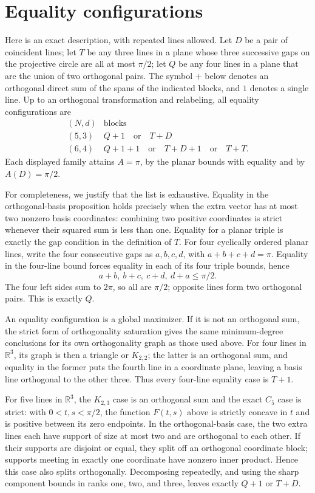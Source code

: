 \documentclass[11pt]{article}
\begin{document}
\section*{Equality configurations}

Here is an exact description, with repeated lines allowed.  Let $D$
be a pair of coincident lines; let $T$ be any three lines in a plane
whose three successive gaps on the projective circle are all at most
$\pi/2$; let $Q$ be any four lines in a plane that are the union of
two orthogonal pairs.  The symbol $+$ below denotes an orthogonal
direct sum of the spans of the indicated blocks, and $1$ denotes a
single line.  Up to an orthogonal transformation and relabeling,
all equality configurations are
\[
 \begin{array}{c|c}
 (N,d)&\text{blocks}\\ \hline
 (5,3)&Q+1\quad\text{or}\quad T+D\\
 (6,4)&Q+1+1\quad\text{or}\quad T+D+1
                  \quad\text{or}\quad T+T.
 \end{array}
\]
Each displayed family attains $A=\pi$, by the planar bounds with
equality and by $A(D)=\pi/2$.

For completeness, we justify that the list is exhaustive.  Equality
in the orthogonal-basis proposition holds precisely when the extra
vector has at most two nonzero basis coordinates: combining two
positive coordinates is strict whenever their squared sum is less
than one.  Equality for a planar triple is exactly the gap condition
in the definition of $T$.  For four cyclically ordered planar lines,
write the four consecutive gaps as $a,b,c,d$, with
$a+b+c+d=\pi$.  Equality in the four-line bound forces equality in
each of its four triple bounds, hence
\[
 a+b,\ b+c,\ c+d,\ d+a\leq\pi/2.
\]
The four left sides sum to $2\pi$, so all are $\pi/2$; opposite
lines form two orthogonal pairs.  This is exactly $Q$.

An equality configuration is a global maximizer.  If it is not an
orthogonal sum, the strict form of orthogonality saturation gives
the same minimum-degree conclusions for its own orthogonality graph
as those used above.  For four lines in $\mathbb R^3$, its graph is
then a triangle or $K_{2,2}$; the latter is an orthogonal sum, and
equality in the former puts the fourth line in a coordinate plane,
leaving a basis line orthogonal to the other three.  Thus every
four-line equality case is $T+1$.

For five lines in $\mathbb R^3$, the $K_{2,3}$ case is an orthogonal
sum and the exact $C_5$ case is strict: with $0<t,s<\pi/2$, the
function $F(t,s)$ above is strictly concave in $t$ and is positive
between its zero endpoints.  In the orthogonal-basis case, the two
extra lines each have support of size at most two and are orthogonal
to each other.  If their supports are disjoint or equal, they split
off an orthogonal coordinate block; supports meeting in exactly one
coordinate have nonzero inner product.  Hence
this case also splits orthogonally.  Decomposing repeatedly, and
using the sharp component bounds in ranks one, two, and three,
leaves exactly $Q+1$ or $T+D$.
\end{document}
